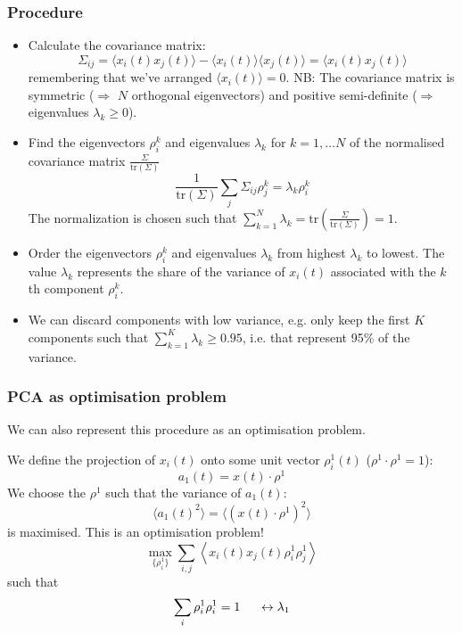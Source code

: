 \documentclass[10pt,aspectratio=169,dvipsnames]{beamer}
\def\l{\lambda}
\let\olditem\item
\renewcommand{\item}{%
\olditem\vspace{5pt}}
\begin{document}
\begin{frame}
  \frametitle{Procedure}

  \begin{itemize}
  \item Calculate the \alert{covariance matrix}:
    \begin{equation*}
      \Sigma_{ij} = \langle x_i(t) x_j(t) \rangle -\langle x_i(t) \rangle \langle x_j (t) \rangle = \langle x_i(t) x_j(t) \rangle
    \end{equation*}
    remembering that we've arranged $\langle x_i(t) \rangle = 0$. NB: The covariance matrix is \alert{symmetric} ($\Rightarrow$ $N$ orthogonal eigenvectors) and \alert{positive semi-definite} ($\Rightarrow$ eigenvalues $\l_k \geq 0$).
  \item Find the \alert{eigenvectors} $\rho^k_i$ and \alert{eigenvalues} $\lambda_k$ for $k=1,\dots N$ of the \alert{normalised covariance matrix} $\frac{\Sigma}{\textrm{tr}(\Sigma)}$
    \begin{equation*}
      \frac{1}{\textrm{tr}(\Sigma)}\sum_j \Sigma_{ij} \rho^k_j = \lambda_k \rho^k_i
    \end{equation*}
    The normalization is chosen such that $\sum_{k=1}^N \lambda_k = \textrm{tr} \left(\frac{\Sigma}{\textrm{tr}(\Sigma)}\right) = 1$.
  \item Order the eigenvectors $\rho^k_i$ and eigenvalues $\lambda_k$ from highest $\lambda_k$ to lowest. The value $\lambda_k$ represents the share of the variance of $x_i(t)$ associated with the $k$th component $\rho^k_i$.
    \item We can discard components with low variance, e.g. only keep the first $K$ components such that $\sum_{k=1}^K\lambda_k \geq  0.95$, i.e. that represent 95\% of the variance.
  \end{itemize}

\end{frame}



\begin{frame}
  \frametitle{PCA as optimisation problem}
  We can also represent this procedure as an optimisation problem.

  We define the projection of $x_i(t)$ onto some unit vector $\rho^1_i(t)$ ($\rho^1 \cdot \rho^1 =1$):
  \begin{equation*}
    a_1(t) = x(t) \cdot \rho^1
  \end{equation*}
  We choose the $\rho^1$ such that the variance of $a_1(t)$:
  \begin{equation*}
    \langle a_1(t)^2 \rangle = \langle (x(t) \cdot \rho^1)^2 \rangle
  \end{equation*}
  is maximised. This is an optimisation problem!
  \begin{equation*}
    \max_{\{\rho_i^1\}} \sum_{i,j} \left\langle x_i(t)x_j(t) \rho^1_i  \rho^1_j \right\rangle
  \end{equation*}
  such that
  \begin{equation*}
    \sum_i \rho^1_i \rho^1_i = 1 \hspace{.5cm} \leftrightarrow \lambda_1
  \end{equation*}

\end{frame}
\end{document}
